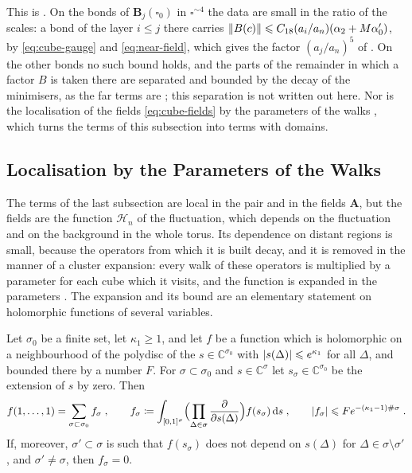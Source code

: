\documentclass[11pt]{preprint}
\newcommand{\dd}{\mathrm{d}}
\DeclarePairedDelimiter{\abs}{\lvert}{\rvert}
\DeclarePairedDelimiter{\norm}{\lVert}{\rVert}
\numberwithin{equation}{section}
\begin{document}
This is \cite[(3.34), (3.54)]{BalabanRG1}. On the bonds of $\mathbf B_j(\square_0)$ in $\square^{\sim4}$ the data are small in the ratio of the scales: a bond of the layer $i \leqslant j$ there carries $\norm{B(c)} \leqslant C_{18}(a_i/a_n)(\alpha_2 + M\alpha'_0)$, by \eqref{eq:cube-gauge} and \eqref{eq:near-field}, which gives the factor $(a_j/a_n)^5$ of \cite[(3.35)]{BalabanRG1}. On the other bonds no such bound holds, and the parts of the remainder in which a factor $B$ is taken there are separated and bounded by the decay of the minimisers, as the far terms are \cite[p.~280]{BalabanRG1}; this separation is not written out here. Nor is the localisation of the fields \eqref{eq:cube-fields} by the parameters of the walks \cite[Sect.~1]{BalabanRG2}, which turns the terms of this subsection into terms with domains.

\subsection{Localisation by the Parameters of the Walks}\label{sec:walk-parameters}

The terms of the last subsection are local in the pair and in the fields $\mathbf A$, but the fields are the function $\mathcal H_n$ of the fluctuation, which depends on the fluctuation and on the background in the whole torus. Its dependence on distant regions is small, because the operators from which it is built decay, and it is removed in the manner of a cluster expansion: every walk of these operators is multiplied by a parameter for each cube which it visits, and the function is expanded in the parameters \cite[(1.5)--(1.25), pp.~3--7]{BalabanRG2}. The expansion and its bound are an elementary statement on holomorphic functions of several variables.

\begin{lemma}\label{lem:parameter-expansion}
Let $\sigma_0$ be a finite set, let $\kappa_1 \geqslant 1$, and let $f$ be a function which is holomorphic on a neighbourhood of the polydisc of the $s \in \mathbb C^{\sigma_0}$ with $\abs{s(\Delta)} \leqslant e^{\kappa_1}$ for all $\Delta$, and bounded there by a number $F$. For $\sigma \subset \sigma_0$ and $s \in \mathbb C^{\sigma}$ let $s_\sigma \in \mathbb C^{\sigma_0}$ be the extension of $s$ by zero. Then
\begin{equation}\label{eq:parameter-expansion}
    f(1, \dots, 1) = \sum_{\sigma \subset \sigma_0}f_\sigma\;,
    \qquad
    f_\sigma \coloneqq \int_{[0,1]^\sigma}\Bigl(\prod_{\Delta \in \sigma}\frac{\partial}{\partial s(\Delta)}\Bigr)f(s_\sigma)\,\dd s\;,
    \qquad
    \abs{f_\sigma} \leqslant Fe^{-(\kappa_1 - 1)\#\sigma}\;.
\end{equation}
If, moreover, $\sigma' \subset \sigma$ is such that $f(s_\sigma)$ does not depend on $s(\Delta)$ for $\Delta \in \sigma \setminus \sigma'$, and $\sigma' \neq \sigma$, then $f_\sigma = 0$.
\end{lemma}
\end{document}
